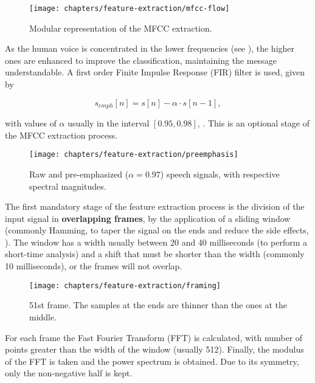 \begin{figure}[ht]
    \centering
    \texttt{[image: chapters/feature-extraction/mfcc-flow]}
    \caption{Modular representation of the MFCC extraction.}
    \label{fig:mfcc-flow}
\end{figure}


As the human voice is concentrated in the lower frequencies (see ), the higher ones are enhanced to improve the classification, maintaining the message understandable. A first order Finite Impulse Response (FIR) filter is used, given by

\begin{equation}
    s_{emph}[n] = s[n] - \alpha \cdot s[n - 1],
    \label{eq:preemphasis}
\end{equation}

\noindent with values of $\alpha$ usually in the interval $[0.95, 0.98]$, . This is an optional stage of the MFCC extraction process.

\begin{figure}[ht]
    \centering
    \texttt{[image: chapters/feature-extraction/preemphasis]}
    \caption{Raw and pre-emphasized ($\alpha = 0.97$) speech signals, with respective spectral magnitudes.}
    \label{fig:preemphasis}
\end{figure}


The first mandatory stage of the feature extraction process is the division of the input signal in \textbf{overlapping frames}, by the application of a sliding window (commonly Hamming, to taper the signal on the ends and reduce the side effects, ). The window has a width usually between 20 and 40 milliseconds (to perform a short-time analysis) and a shift that must be shorter than the width (commonly 10 milliseconds), or the frames will not overlap.

\begin{figure}[ht]
    \centering
    \texttt{[image: chapters/feature-extraction/framing]}
    \caption{51st frame. The samples at the ends are thinner than the ones at the middle.}
    \label{fig:framing}
\end{figure}


For each frame the Fast Fourier Transform (FFT) is calculated, with number of points greater than the width of the window (usually 512). Finally, the modulus of the FFT is taken and the power spectrum is obtained. Due to its symmetry, only the non-negative half is kept.


